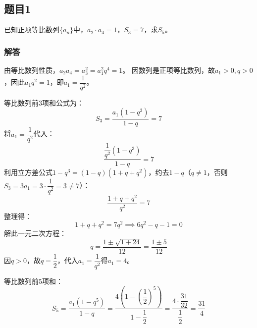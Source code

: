 \documentclass{article}
\begin{document}
	
	\subsection*{题目1}
	已知正项等比数列$\{a_n\}$中，$a_2 \cdot a_4 = 1$，$S_3 = 7$，求$S_5$。
	
	\subsubsection*{解答}
	由等比数列性质，$a_2 a_4 = a_3^2 = a_1^2 q^4 = 1$。
	因数列是正项等比数列，故$a_1 > 0, q > 0$，因此$a_1 q^2 = 1$，即$a_1 = \dfrac{1}{q^2}$。
	
	等比数列前$3$项和公式为：
	\[
	S_3 = \frac{a_1(1 - q^3)}{1 - q} = 7
	\]
	将$a_1 = \dfrac{1}{q^2}$代入：
	\[
	\frac{\dfrac{1}{q^2}(1 - q^3)}{1 - q} = 7
	\]
	利用立方差公式$1 - q^3 = (1 - q)(1 + q + q^2)$，约去$1 - q$（$q \neq 1$，否则$S_3 = 3a_1 = 3 \cdot \dfrac{1}{q^2} = 3 \neq 7$）：
	\[
	\frac{1 + q + q^2}{q^2} = 7
	\]
	整理得：
	\[
	1 + q + q^2 = 7q^2 \implies 6q^2 - q - 1 = 0
	\]
	解此一元二次方程：
	\[
	q = \frac{1 \pm \sqrt{1 + 24}}{12} = \frac{1 \pm 5}{12}
	\]
	因$q > 0$，故$q = \dfrac{1}{2}$，代入$a_1 = \dfrac{1}{q^2}$得$a_1 = 4$。
	
	等比数列前$5$项和：
	\[
	S_5 = \frac{a_1(1 - q^5)}{1 - q} = \frac{4\left(1 - \left(\dfrac{1}{2}\right)^5\right)}{1 - \dfrac{1}{2}} = \frac{4 \cdot \dfrac{31}{32}}{\dfrac{1}{2}} = \frac{31}{4}
	\]
	
	
\end{document}

